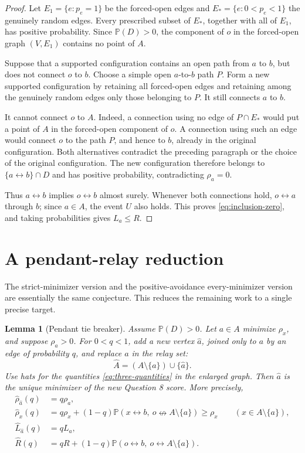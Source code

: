 \documentclass[11pt]{article}
\newtheorem{lemma}[theorem]{Lemma}
\theoremstyle{definition}
\newcommand{\PP}{\mathbb P}
\newcommand{\con}{\leftrightarrow}
\newcommand{\ncon}{\nleftrightarrow}
\newcommand{\1}{\mathbf 1}
\begin{document}
\begin{proof}
Let \(E_1=\{e:p_e=1\}\) be the forced-open edges and
\(E_*=\{e:0<p_e<1\}\) the genuinely random edges.  Every prescribed
subset of \(E_*\), together with all of \(E_1\), has positive probability.
Since \(\PP(D)>0\), the component of \(o\) in the forced-open graph
\((V,E_1)\) contains no point of \(A\).

Suppose that a supported configuration contains an open path from \(a\)
to \(b\), but does not connect \(o\) to \(b\).  Choose a simple open
\(a\)-to-\(b\) path \(P\).  Form a new supported configuration by retaining
all forced-open edges and retaining among the genuinely random edges only
those belonging to \(P\).  It still connects \(a\) to \(b\).

It cannot connect \(o\) to \(A\).  Indeed, a connection using no edge of
\(P\cap E_*\) would put a point of \(A\) in the forced-open component of
\(o\).  A connection using such an edge would connect \(o\) to the path
\(P\), and hence to \(b\), already in the original configuration.  Both
alternatives contradict the preceding paragraph or the choice of the
original configuration.  The new configuration therefore belongs to
\(\{a\con b\}\cap D\) and has positive probability, contradicting
\(\rho_a=0\).

Thus \(a\con b\) implies \(o\con b\) almost surely.  Whenever both
connections hold, \(o\con a\) through \(b\); since \(a\in A\), the event
\(U\) also holds.  This proves \eqref{eq:inclusion-zero}, and taking
probabilities gives \(L_a\le R\).
\end{proof}

\section{A pendant-relay reduction}

The strict-minimizer version and the positive-avoidance every-minimizer
version are essentially the same conjecture.  This reduces the remaining
work to a single precise target.

\begin{lemma}[Pendant tie breaker]\label{lem:pendant}
Assume \(\PP(D)>0\).  Let \(a\in A\) minimize \(\rho_x\), and suppose
\(\rho_a>0\).  For \(0<q<1\), add a new vertex \(\widehat a\), joined only
to \(a\) by an edge of probability \(q\), and replace \(a\) in the relay set:
\[
 \widehat A=(A\setminus\{a\})\cup\{\widehat a\}.
\]
Use hats for the quantities \eqref{eq:three-quantities} in the enlarged
graph.  Then \(\widehat a\) is the unique minimizer of the new Question 8
score.  More precisely,
\begin{align}
 \widehat\rho_{\widehat a}(q)&=q\rho_a,
 \label{eq:pendant-rhoa}\\
 \widehat\rho_x(q)&=q\rho_x+(1-q)
   \PP(x\con b,\ o\ncon A\setminus\{a\})
   \ge \rho_x \qquad(x\in A\setminus\{a\}),
 \label{eq:pendant-rhox}\\
 \widehat L_{\widehat a}(q)&=qL_a,
 \label{eq:pendant-L}\\
 \widehat R(q)&=qR+(1-q)
   \PP(o\con b,\ o\con A\setminus\{a\}).
 \label{eq:pendant-R}
\end{align}
\end{lemma}
\end{document}
